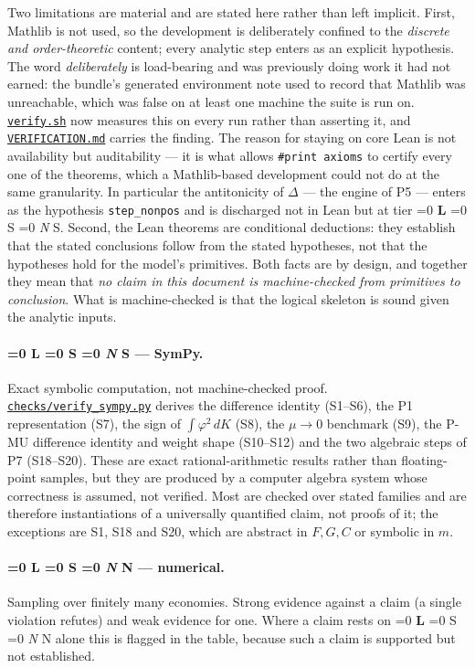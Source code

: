 \documentclass[11pt]{article}
\newcommand{\file}[1]{\href{run:#1}{\texttt{#1}}}
\newcommand{\tier}[1]{%
  \ifnum\pdfstrcmp{#1}{L}=0 \textbf{L}%
  \else\ifnum\pdfstrcmp{#1}{S}=0 S%
  \else\ifnum\pdfstrcmp{#1}{N}=0 \emph{N}%
  \else #1\fi\fi\fi}
\begin{document}
Two limitations are material and are stated here rather than left implicit.
First, Mathlib is not used, so the development is deliberately confined to
the \emph{discrete and order-theoretic} content; every analytic step enters
as an explicit hypothesis. The word \emph{deliberately} is load-bearing and
was previously doing work it had not earned: the bundle's generated
environment note used to record that Mathlib was unreachable, which was false
on at least one machine the suite is run on. \file{verify.sh} now measures
this on every run rather than asserting it, and \file{VERIFICATION.md} carries
the finding. The reason for staying on core Lean is not availability but
auditability --- it is what allows \texttt{\#print axioms} to certify every
one of the theorems, which a Mathlib-based development could not do at the
same granularity. In particular the antitonicity of $\Delta$ --- the
engine of P5 --- enters as the hypothesis \texttt{step\_nonpos} and is
discharged not in Lean but at tier \tier{S}. Second, the Lean theorems are
conditional deductions: they establish that the stated conclusions follow
from the stated hypotheses, not that the hypotheses hold for the model's
primitives. Both facts are by design, and together they mean that
\emph{no claim in this document is machine-checked from primitives to
conclusion}. What is machine-checked is that the logical skeleton is sound
given the analytic inputs.

\paragraph{\tier{S} --- SymPy.} Exact symbolic computation, not machine-checked
proof. \file{checks/verify\_sympy.py} derives the difference identity (S1--S6),
the P1 representation (S7), the sign of $\int\varphi^2\,dK$ (S8), the
$\mu\to0$ benchmark (S9), the P-MU difference identity and weight shape
(S10--S12) and the two algebraic steps of P7 (S18--S20). These are exact
rational-arithmetic results rather than floating-point samples, but they are
produced by a computer algebra system whose correctness is assumed, not
verified. Most are checked over stated families and are therefore
instantiations of a universally quantified claim, not proofs of it; the
exceptions are S1, S18 and S20, which are abstract in $F,G,C$ or symbolic
in $m$.

\paragraph{\tier{N} --- numerical.} Sampling over finitely many economies.
Strong evidence against a claim (a single violation refutes) and weak
evidence for one. Where a claim rests on \tier{N} alone this is flagged in
the table, because such a claim is supported but not established.
\end{document}
